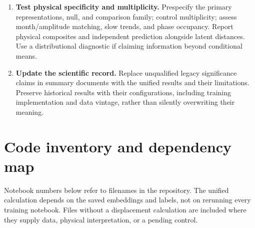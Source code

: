 \documentclass[11pt]{article}
\begin{document}
\begin{enumerate}
\item \textbf{Test physical specificity and multiplicity.} Prespecify the primary representations, null, and comparison family; control multiplicity; assess month/amplitude matching, slow trends, and phase occupancy. Report physical composites and independent prediction alongside latent distances. Use a distributional diagnostic if claiming information beyond conditional means.
\item \textbf{Update the scientific record.} Replace unqualified legacy significance claims in summary documents with the unified results and their limitations. Preserve historical results with their configurations, including training implementation and data vintage, rather than silently overwriting their meaning.
\end{enumerate}

\appendix
\section{Code inventory and dependency map}
\label{app:code}

Notebook numbers below refer to filenames in the repository. The unified calculation depends on the saved embeddings and labels, not on rerunning every training notebook. Files without a displacement calculation are included where they supply data, physical interpretation, or a pending control.
\end{document}
